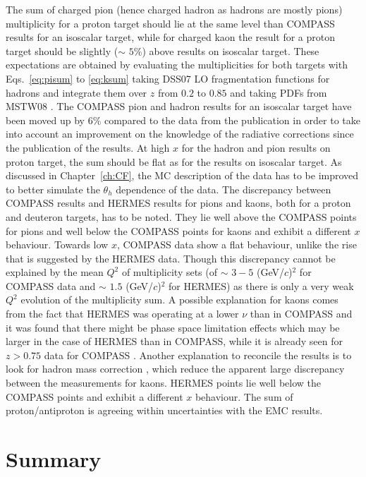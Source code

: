 The sum of charged pion (hence charged hadron as hadrons are mostly pions) multiplicity for a proton target should lie at the same level than COMPASS results for an isoscalar target, while for charged kaon the result for a proton target should be slightly ($\sim$ $5$\%) above results on isoscalar target. These expectations are obtained by evaluating the multiplicities for both targets with Eqs.~\ref{eq:pisum} to \ref{eq:ksum} taking DSS07 \cite{DSS07} LO fragmentation functions for hadrons and integrate them over $z$ from $0.2$ to $0.85$ and taking PDFs from MSTW08 \cite{MSTW08}. The COMPASS pion and hadron results for an isoscalar target have been moved up by $6$\% compared to the data from the publication in order to take into account an improvement on the knowledge of the radiative corrections since the publication of the results. At high $x$ for the hadron and pion results on proton target, the sum should be flat as for the results on isoscalar target. As discussed in Chapter~\ref{ch:CF}, the MC description of the data has to be improved to better simulate the $\theta_h$ dependence of the data. The discrepancy between COMPASS results and HERMES results for pions and kaons, both for a proton and deuteron targets, has to be noted. They lie well above the COMPASS points for pions and well below the COMPASS points for kaons and exhibit a different $x$ behaviour. Towards low $x$, COMPASS data show a flat behaviour, unlike the rise that is suggested by the HERMES data. Though this discrepancy cannot be explained by the mean $Q^2$ of multiplicity sets (of $\sim$ $3-5$ (GeV/$c$)$^2$ for COMPASS data and $\sim$ $1.5$ (GeV/$c$)$^2$ for HERMES) as there is only a very weak $Q^2$ evolution of the multiplicity sum. A possible explanation for kaons comes from the fact that HERMES was operating at a lower $\nu$ than in COMPASS and it was found that there might be phase space limitation effects which may be larger in the case of HERMES than in COMPASS, while it is already seen for $z>0.75$ data for COMPASS \cite{MarcinPubli}. Another explanation to reconcile the results is to look for hadron mass correction \cite{Accardi}, which reduce the apparent large discrepancy between the measurements for kaons. HERMES points lie well below the COMPASS points and exhibit a different $x$ behaviour. The sum of proton/antiproton is agreeing within uncertainties with the EMC results.

\section{Summary}

